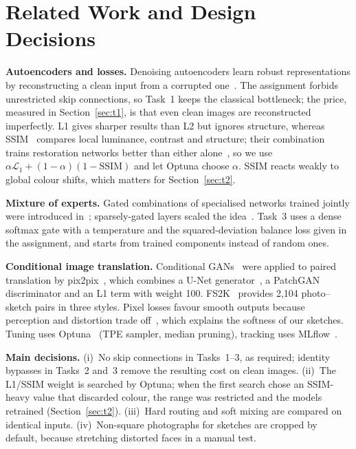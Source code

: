 \section{Related Work and Design Decisions}\label{sec:related}
\textbf{Autoencoders and losses.} Denoising autoencoders learn robust representations by reconstructing a clean input from a corrupted one~\cite{vincent2008}. The assignment forbids unrestricted skip connections, so Task~1 keeps the classical bottleneck; the price, measured in Section~\ref{sec:t1}, is that even clean images are reconstructed imperfectly. L1 gives sharper results than L2 but ignores structure, whereas SSIM~\cite{wang2004ssim} compares local luminance, contrast and structure; their combination trains restoration networks better than either alone~\cite{zhao2017loss}, so we use $\alpha\mathcal{L}_1+(1-\alpha)(1-\mathrm{SSIM})$ and let Optuna choose $\alpha$. SSIM reacts weakly to global colour shifts, which matters for Section~\ref{sec:t2}.

\textbf{Mixture of experts.} Gated combinations of specialised networks trained jointly were introduced in~\cite{jacobs1991}; sparsely-gated layers scaled the idea~\cite{shazeer2017}. Task~3 uses a dense softmax gate with a temperature and the squared-deviation balance loss given in the assignment, and starts from trained components instead of random ones.

\textbf{Conditional image translation.} Conditional GANs~\cite{mirza2014} were applied to paired translation by pix2pix~\cite{isola2017}, which combines a U-Net generator~\cite{ronneberger2015}, a PatchGAN discriminator and an L1 term with weight 100. FS2K~\cite{fan2022fs2k} provides 2,104 photo--sketch pairs in three styles. Pixel losses favour smooth outputs because perception and distortion trade off~\cite{blau2018}, which explains the softness of our sketches. Tuning uses Optuna~\cite{akiba2019} (TPE sampler, median pruning), tracking uses MLflow~\cite{mlflow}.

\textbf{Main decisions.} (i)~No skip connections in Tasks~1--3, as required; identity bypasses in Tasks~2 and~3 remove the resulting cost on clean images. (ii)~The L1/SSIM weight is searched by Optuna; when the first search chose an SSIM-heavy value that discarded colour, the range was restricted and the models retrained (Section~\ref{sec:t2}). (iii)~Hard routing and soft mixing are compared on identical inputs. (iv)~Non-square photographs for sketches are cropped by default, because stretching distorted faces in a manual test.
